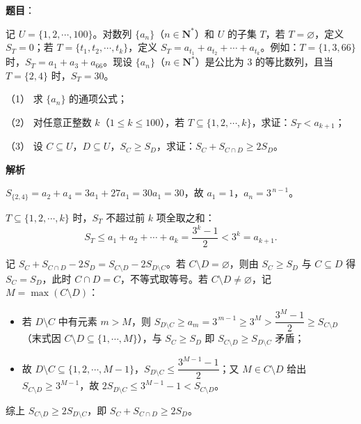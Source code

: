 \begin{answer}

\textbf{题目}：

记 \(U=\{1,2,\cdots,100\}\)。对数列 \(\{a_{n}\}\)（\(n\in\mathbf{N}^{*}\)）和 \(U\) 的子集 \(T\)，若 \(T=\varnothing\)，定义 \(S_{T}=0\)；若 \(T=\{t_{1},t_{2},\cdots,t_{k}\}\)，定义 \(S_{T}=a_{t_{1}}+a_{t_{2}}+\cdots+a_{t_{k}}\)。例如：\(T=\{1,3,66\}\) 时，\(S_{T}=a_{1}+a_{3}+a_{66}\)。现设 \(\{a_{n}\}\)（\(n\in\mathbf{N}^{*}\)）是公比为 3 的等比数列，且当 \(T=\{2,4\}\) 时，\(S_{T}=30\)。

（1） 求 \(\{a_{n}\}\) 的通项公式；

（2） 对任意正整数 \(k\)（\(1\leqslant k\leqslant 100\)），若 \(T\subseteq\{1,2,\cdots,k\}\)，求证：\(S_{T}<a_{k+1}\)；

（3） 设 \(C\subseteq U\)，\(D\subseteq U\)，\(S_{C}\geqslant S_{D}\)，求证：\(S_{C}+S_{C\cap D}\geqslant 2S_{D}\)。

\textbf{解析}


\(S_{\{2,4\}}=a_{2}+a_{4}=3a_{1}+27a_{1}=30a_{1}=30\)，故 \(a_{1}=1\)，\(a_{n}=3^{\,n-1}\)。


\(T\subseteq\{1,2,\cdots,k\}\) 时，\(S_{T}\) 不超过前 \(k\) 项全取之和：
\nopagebreak[4]
\[
S_{T}\leqslant a_{1}+a_{2}+\cdots+a_{k}=\frac{3^{k}-1}{2}<3^{k}=a_{k+1}.
\]


记 \(S_{C}+S_{C\cap D}-2S_{D}=S_{C\setminus D}-2S_{D\setminus C}\)。若 \(C\setminus D=\varnothing\)，则由 \(S_{C}\geqslant S_{D}\) 与 \(C\subseteq D\) 得 \(S_{C}=S_{D}\)，此时 \(C\cap D=C\)，不等式取等号。若 \(C\setminus D\neq\varnothing\)，记 \(M=\max(C\setminus D)\)：

\begin{itemize}
\item 若 \(D\setminus C\) 中有元素 \(m>M\)，则 \(S_{D\setminus C}\geqslant a_{m}=3^{\,m-1}\geqslant3^{M}>\dfrac{3^{M}-1}{2}\geqslant S_{C\setminus D}\)（末式因 \(C\setminus D\subseteq\{1,\cdots,M\}\)），与 \(S_{C}\geqslant S_{D}\) 即 \(S_{C\setminus D}\geqslant S_{D\setminus C}\) 矛盾；
\item 故 \(D\setminus C\subseteq\{1,2,\cdots,M-1\}\)，\(S_{D\setminus C}\leqslant\dfrac{3^{M-1}-1}{2}\)；又 \(M\in C\setminus D\) 给出 \(S_{C\setminus D}\geqslant3^{M-1}\)，故 \(2S_{D\setminus C}\leqslant3^{M-1}-1<S_{C\setminus D}\)。
\end{itemize}

综上 \(S_{C\setminus D}\geqslant2S_{D\setminus C}\)，即 \(S_{C}+S_{C\cap D}\geqslant2S_{D}\)。




\end{answer}
